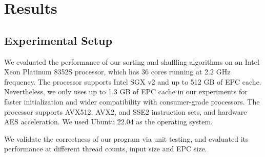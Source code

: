 \documentclass{article}
\begin{document}










\section{Results}
\subsection{Experimental Setup}
We evaluated the performance of our sorting and shuffling algorithms on an Intel Xeon Platinum 8352S processor, which has 36 cores running at 2.2 GHz
frequency. The processor supports Intel SGX v2 and up to 512 GB of EPC cache. Nevertheless, we only uses up to 1.3 GB of EPC cache in our experiments for faster initialization and wider compatibility with consumer-grade processors. The processor supports AVX512, AVX2, and SSE2 instruction sets, and hardware AES acceleration. We used Ubuntu 22.04 as the operating system.

We validate the correctness of our program via unit testing, and evaluated its performance at different thread counts, input size and EPC size.
\end{document}
